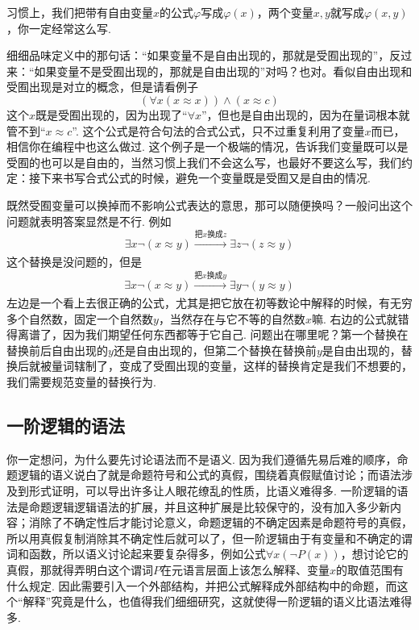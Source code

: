 \documentclass[main.tex]{subfiles}
\begin{document}
习惯上，我们把带有自由变量\(x\)的公式\(\varphi\)写成\(\varphi(x)\)，两个变量\(x,y\)就写成\(\varphi(x,y)\)，你一定经常这么写. 

细细品味定义中的那句话：“如果变量不是自由出现的，那就是受囿出现的”，反过来：“如果变量不是受囿出现的，那就是自由出现的”对吗？也对。看似自由出现和受囿出现是对立的概念，但是请看例子
\[(\forall x(x \approx x)) \wedge (x \approx c)\]
这个\(x\)既是受囿出现的，因为出现了“\(\forall x\)”，但也是自由出现的，因为在量词根本就管不到“\(x \approx c\)”. 这个公式是符合句法的合式公式，只不过重复利用了变量\(x\)而已，相信你在编程中也这么做过. 这个例子是一个极端的情况，告诉我们变量既可以是受囿的也可以是自由的，当然习惯上我们不会这么写，也最好不要这么写，我们约定：接下来书写合式公式的时候，避免一个变量既是受囿又是自由的情况.

既然受囿变量可以换掉而不影响公式表达的意思，那可以随便换吗？一般问出这个问题就表明答案显然是不行. 例如
\[\exists x \neg(x \approx y) \xrightarrow[]{\mbox{把}x\mbox{换成}z} \exists z \neg (z \approx y)\]
这个替换是没问题的，但是
\[\exists x \neg(x \approx y) \xrightarrow[]{\mbox{把}x\mbox{换成}y} \exists y \neg (y \approx y)\]
左边是一个看上去很正确的公式，尤其是把它放在初等数论中解释的时候，有无穷多个自然数，固定一个自然数\(y\)，当然存在与它不等的自然数\(x\)嘛. 右边的公式就错得离谱了，因为我们期望任何东西都等于它自己. 问题出在哪里呢？第一个替换在替换前后自由出现的\(y\)还是自由出现的，但第二个替换在替换前\(y\)是自由出现的，替换后就被量词辖制了，变成了受囿出现的变量，这样的替换肯定是我们不想要的，我们需要规范变量的替换行为.

\subsection{一阶逻辑的语法}

你一定想问，为什么要先讨论语法而不是语义. 因为我们遵循先易后难的顺序，命题逻辑的语义说白了就是命题符号和公式的真假，围绕着真假赋值讨论；而语法涉及到形式证明，可以导出许多让人眼花缭乱的性质，比语义难得多. 一阶逻辑的语法是命题逻辑逻辑语法的扩展，并且这种扩展是比较保守的，没有加入多少新内容；消除了不确定性后才能讨论意义，命题逻辑的不确定因素是命题符号的真假，所以用真假复制消除其不确定性后就可以了，但一阶逻辑由于有变量和不确定的谓词和函数，所以语义讨论起来要复杂得多，例如公式\(\forall x (\neg P(x))\)，想讨论它的真假，那就得弄明白这个谓词\(P\)在元语言层面上该怎么解释、变量\(x\)的取值范围有什么规定. 因此需要引入一个外部结构，并把公式解释成外部结构中的命题，而这个“解释”究竟是什么，也值得我们细细研究，这就使得一阶逻辑的语义比语法难得多.
\end{document}

